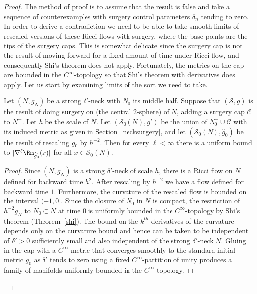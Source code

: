 \begin{proof}
The method of proof is to assume that the result is false and take
a sequence of counterexamples with surgery control parameters
$\delta_n$ tending to zero. In order to derive a contradiction we
need to be able to take smooth limits of rescaled versions of these
Ricci flows with surgery, where the base points are the tips of the
surgery caps. This is somewhat delicate since the surgery cap is not
the result of moving forward for a fixed amount of time under Ricci
flow, and consequently Shi's theorem does not apply. Fortunately,
the metrics on the cap are bounded in the $C^\infty$-topology so
that Shi's theorem with derivatives does apply. Let us start
by examining limits of the sort we need to take.

\begin{claim}
\label{claim:surgery-cap-curvature-bound-uniform}
Let $(N,g_N)$ be a strong $\delta'$-neck with $N_0$ its middle half.
Suppose that $({\mathcal S},g)$ is the result of doing surgery on
(the central $2$-sphere) of $N$, adding a surgery cap ${\mathcal C}$
to $N^-$. Let $h$ be the scale of $N$. Let $({\mathcal S}_0(N),g')$
be the union of $N^-_0\cup {\mathcal C}$ with its induced metric as
given in Section~\ref{necksurgery}, and let $({\mathcal
S}_0(N),\widehat g_0)$ be the result of rescaling $g_0$ by $h^{-2}$.
Then for every $\ell<\infty$ there is a uniform bound to
$|\nabla^\ell \Rm_{\widehat g_0}(x)|$ for all $x\in {\mathcal
S}_0(N)$.
\end{claim}

\begin{proof}
Since $(N,g_N)$ is a strong $\delta'$-neck of scale $h$, there is a
Ricci flow on $N$ defined for backward time $h^2$. After rescaling
by $h^{-2}$ we have a flow defined for backward time $1$.
Furthermore, the curvature of the rescaled flow is bounded on the
interval $(-1,0]$. Since the closure of $N_0$ in $N$ is compact, the
restriction of $h^{-2}g_N$ to $N_0\subset N$ at time $0$ is
uniformly bounded in the $C^\infty$-topology by Shi's theorem
(Theorem~\ref{shi}). The bound on the $k^{th}$-derivatives of the
curvature depends only on the curvature bound and hence can be taken
to be independent of $\delta'>0$ sufficiently small and also
independent of the strong $\delta'$-neck $N$. Gluing in the cap with
a  $C^\infty$-metric that converges smoothly to the standard initial
metric $g_0$ as $\delta'$ tends to zero using a fixed
$C^\infty$-partition of unity produces a family of manifolds
uniformly bounded in the $C^\infty$-topology.
\end{proof}


\end{proof}
